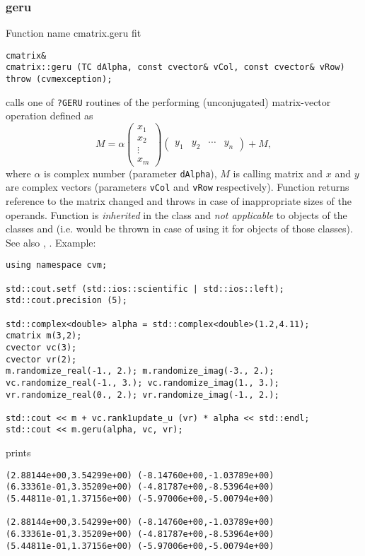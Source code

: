 \subsubsection{geru}
Function%
\pdfdest name {cmatrix.geru} fit
\begin{verbatim}
cmatrix&
cmatrix::geru (TC dAlpha, const cvector& vCol, const cvector& vRow)
throw (cvmexception);
\end{verbatim}
calls one of \verb"?GERU" routines of the
performing  
(unconjugated)
matrix-vector operation defined as
\begin{equation*}
M=\alpha\begin{pmatrix}
x_1 \\
x_2 \\
\vdots \\
x_m
\end{pmatrix}
\begin{pmatrix}
y_1 & y_2 & \cdots & y_n
\end{pmatrix} + M,
\end{equation*}
where $\alpha$ is  complex number
(parameter \verb"dAlpha"),
$M$ is  calling matrix
and $x$ and $y$ are complex vectors (parameters \verb"vCol"
and \verb"vRow" respectively).
Function
returns  reference to the matrix changed and throws
in case of inappropriate sizes of the operands.
Function is \emph{inherited} in  the class
 and
\emph{not applicable} to objects of the classes
 and
 (i.e.  would be thrown
in case of using it for objects of those classes).
See also
,
.
Example:
\begin{Verbatim}
using namespace cvm;

std::cout.setf (std::ios::scientific | std::ios::left); 
std::cout.precision (5);

std::complex<double> alpha = std::complex<double>(1.2,4.11);
cmatrix m(3,2);
cvector vc(3);
cvector vr(2);
m.randomize_real(-1., 2.); m.randomize_imag(-3., 2.);
vc.randomize_real(-1., 3.); vc.randomize_imag(1., 3.); 
vr.randomize_real(0., 2.); vr.randomize_imag(-1., 2.); 

std::cout << m + vc.rank1update_u (vr) * alpha << std::endl;
std::cout << m.geru(alpha, vc, vr);
\end{Verbatim}
prints
\begin{Verbatim}
(2.88144e+00,3.54299e+00) (-8.14760e+00,-1.03789e+00)
(6.33361e-01,3.35209e+00) (-4.81787e+00,-8.53964e+00)
(5.44811e-01,1.37156e+00) (-5.97006e+00,-5.00794e+00)

(2.88144e+00,3.54299e+00) (-8.14760e+00,-1.03789e+00)
(6.33361e-01,3.35209e+00) (-4.81787e+00,-8.53964e+00)
(5.44811e-01,1.37156e+00) (-5.97006e+00,-5.00794e+00)
\end{Verbatim}
\newpage



